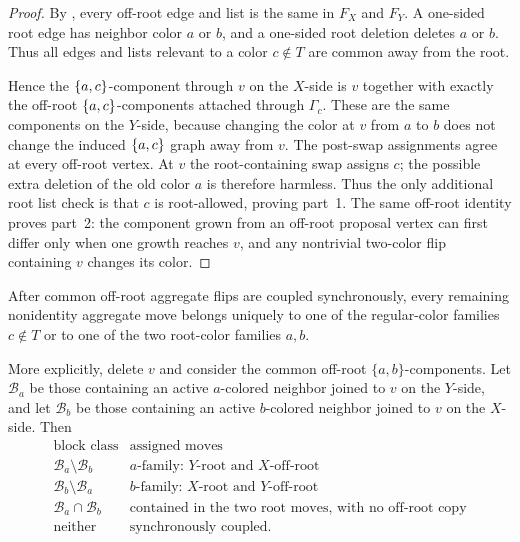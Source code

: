 \begin{proof}
By , every off-root edge and list
is the same in $F_X$ and $F_Y$.  A one-sided root edge has neighbor
color $a$ or $b$, and a one-sided root deletion deletes $a$ or $b$.
Thus all edges and lists relevant to a color $c\notin T$ are common away
from the root.

Hence the $\left\{a,c\right\}$-component through $v$ on the
$X$-side is $v$ together with exactly the off-root
$\left\{a,c\right\}$-components attached through $\Gamma_c$. These are the same
components on the $Y$-side, because changing the color at $v$
from $a$ to $b$ does not change the induced $\left\{a,c\right\}$ graph away from
$v$. The post-swap assignments agree at every off-root vertex. At $v$ the
root-containing swap assigns $c$; the possible extra deletion of the old
color $a$ is therefore harmless. Thus the only additional root list check
is that $c$ is root-allowed, proving part~1. The same off-root identity
proves part~2: the component grown from an off-root proposal vertex can first differ
only when one growth reaches $v$, and any nontrivial two-color flip
containing $v$ changes its color.
\end{proof}

\begin{lemma}\label{lem:cv-move-partition}
After common off-root aggregate flips are coupled synchronously, every
remaining nonidentity aggregate move belongs
uniquely to one of the regular-color families \(c\notin T\) or to one of
the two root-color families \(a,b\).

More explicitly, delete \(v\) and consider the common off-root
\(\{a,b\}\)-components.  Let \(\mathcal B_a\) be those containing an
active \(a\)-colored neighbor joined to \(v\) on the \(Y\)-side, and let
\(\mathcal B_b\) be those containing an active \(b\)-colored neighbor
joined to \(v\) on the \(X\)-side.  Then
\[
\begin{array}{c|c}
\text{block class}&\text{assigned moves}\\ \hline
\mathcal B_a\setminus\mathcal B_b&
  \text{\(a\)-family: \(Y\)-root and \(X\)-off-root}\\
\mathcal B_b\setminus\mathcal B_a&
  \text{\(b\)-family: \(X\)-root and \(Y\)-off-root}\\
\mathcal B_a\cap\mathcal B_b&
  \text{contained in the two root moves, with no off-root copy}\\
\text{neither}&\text{synchronously coupled}.
\end{array}
\]
\end{lemma}

